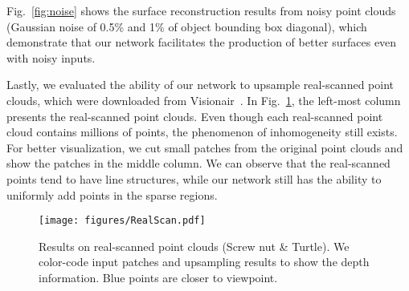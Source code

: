 Fig.~\ref{fig:noise} shows the surface reconstruction results from noisy point clouds (Gaussian noise of 0.5\% and 1\% of object bounding box diagonal), which demonstrate that our network facilitates the production of better surfaces even with noisy inputs.



Lastly, we evaluated the ability of our network to upsample real-scanned point clouds, which were downloaded from Visionair~\cite{timmurphy.org}.
In Fig.~\ref{fig:realscan}, the left-most column presents the real-scanned point clouds. 
Even though each real-scanned point cloud contains millions of points, the phenomenon of inhomogeneity still exists.
For better visualization, we cut small patches from the original point clouds and show the patches in the middle column.
We can observe that the real-scanned points tend to have line structures, while our network still has the ability to uniformly add points in the sparse regions.

\begin{figure}[h]
	\centering
	\texttt{[image: figures/RealScan.pdf]}\vspace{1mm}
	\caption{Results on real-scanned point clouds (Screw nut \& Turtle). We color-code input patches and upsampling results to show the depth information. Blue points are closer to viewpoint.}
	\label{fig:realscan}\vspace{-2mm}
\end{figure}
